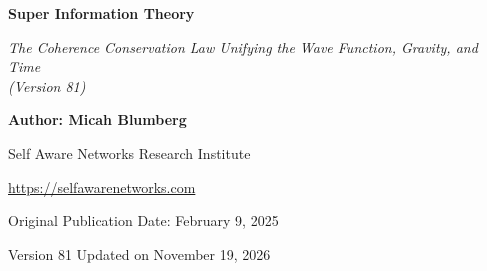 \documentclass[american,11pt,letterpaper]{article}
\author{}
\date{}
\begin{document}
\begin{center}
{\LARGE\bfseries Super Information Theory\par}
\vspace{0.35em}
{\large\itshape The Coherence Conservation Law Unifying the Wave Function, Gravity, and Time\\(Version 81)\par}
\vspace{0.8em}
{\small\textbf{Author: Micah Blumberg}\par}
{\small Self Aware Networks Research Institute\par}
{\small\url{https://selfawarenetworks.com}\par}
{\small Original Publication Date: February 9, 2025\par}
{\small Version 81 Updated on November 19, 2026\par}
\end{center}
\vspace{0.65em}














\end{document}

